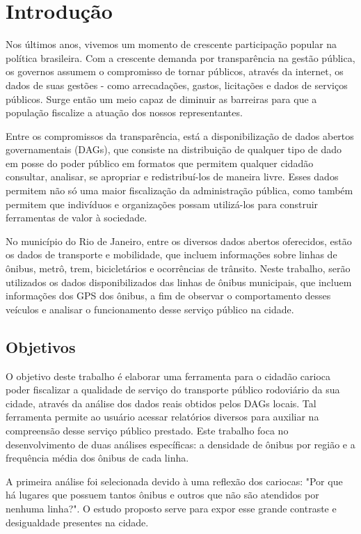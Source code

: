 \chapter{Introdução}\label{chp:CAP_INTRO}

Nos últimos anos, vivemos um momento de crescente participação popular na política brasileira. Com a crescente demanda por transparência na gestão pública, os governos assumem o compromisso de tornar públicos, através da internet, os dados de suas gestões - como arrecadações, gastos, licitações e dados de serviços públicos. Surge então um meio capaz de diminuir as barreiras para que a população fiscalize a atuação dos nossos representantes.

Entre os compromissos da transparência, está a disponibilização de dados abertos governamentais (DAGs), que consiste na distribuição de qualquer tipo de dado em posse do poder público em formatos que permitem qualquer cidadão consultar, analisar, se apropriar e redistribuí-los de maneira livre. Esses dados permitem não só uma maior fiscalização da administração pública, como também permitem que indivíduos e organizações possam utilizá-los para construir ferramentas de valor à sociedade.

No município do Rio de Janeiro, entre os diversos dados abertos oferecidos, estão os dados de transporte e mobilidade, que incluem informações sobre linhas de ônibus, metrô, trem, bicicletários e ocorrências de trânsito. Neste trabalho, serão utilizados os dados disponibilizados das linhas de ônibus municipais, que incluem informações dos GPS dos ônibus, a fim de observar o comportamento desses veículos e analisar o funcionamento desse serviço público na cidade.


\section{Objetivos}\label{sec:CAP_INTRO_OBJETIVOS}

O objetivo deste trabalho é elaborar uma ferramenta para o cidadão carioca poder fiscalizar a qualidade de serviço do transporte público rodoviário da sua cidade, através da análise dos dados reais obtidos pelos DAGs locais. Tal ferramenta permite ao usuário acessar relatórios diversos para auxiliar na compreensão desse serviço público prestado. Este trabalho foca no desenvolvimento de duas análises específicas: a densidade de ônibus por região e a frequência média dos ônibus de cada linha. 

A primeira análise foi selecionada devido à uma reflexão dos cariocas: "Por que há lugares que possuem tantos ônibus e outros que não são atendidos por nenhuma linha?". O estudo proposto serve para expor esse grande contraste e desigualdade presentes na cidade.

